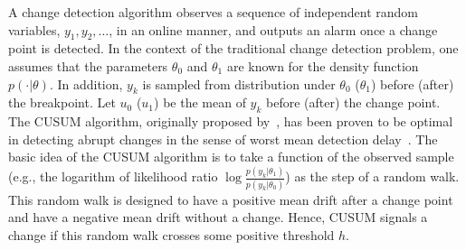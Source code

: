 \documentclass[letterpaper]{article} %
\newcommand{\blue}{}
\begin{document}
A change detection algorithm observes a sequence of independent random variables, $y_1,y_2,\ldots$, in an online manner, and outputs an alarm once a change point is detected. In the context of the traditional change detection problem, one assumes that the parameters $\theta_0$ and $\theta_1$ are known for the density function $p(\cdot|\theta)$. In addition, $y_k$ is sampled from distribution under $\theta_0$ ($\theta_1$) before (after) the breakpoint. Let $u_0$ ($u_1$) be the mean of $y_k$ before (after) the change point. The CUSUM algorithm, originally proposed by~\cite{page1954continuous}, has been proven to be optimal in detecting abrupt changes in the sense of worst mean detection delay~\cite{lorden1971procedures}.
{\blue The basic idea of the CUSUM algorithm is to take a function of the observed sample (e.g., the logarithm of likelihood ratio $\log\frac{p(y_k|\theta_1)}{p(y_k|\theta_0)}$) as the step of a random walk.}
{\blue This random walk is designed to have a positive mean drift after a change point and have a negative mean drift without a change.}
Hence, {\blue CUSUM signals a change if} this random walk crosses some positive threshold $h$.
\end{document}
